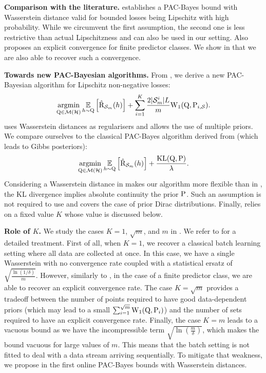 \textbf{Comparison with the literature.} \cite[][Theorem 11]{amit2022integral} establishes a PAC-Bayes bound with Wasserstein distance valid for bounded losses being Lipschitz with high probability. While we circumvent the first assumption, the second one is less restrictive than actual Lipschitzness and can also be used in our setting. Also \cite[Theorem 12]{amit2022integral} proposes an explicit convergence for finite predictor classes. We show in  that we are also able to recover such a convergence. 

\textbf{Towards new PAC-Bayesian algorithms.} From , we derive a new PAC-Bayesian algorithm for Lipschitz non-negative losses:
\begin{equation}
    \label{eq:batch-alg}
    \argmin_{\Q\in\Mcal(\H)} \EE_{h\sim \Q}\left[\Riskhat_{\Sm}(h)\right] + \sum_{i=1}^{K} \frac{2|\Sm^{i}|L}{m} \W_{1}(\Q, \P_{i,\S}).
\end{equation}
 uses Wasserstein distances as regularisers and allows the use of multiple priors. 
We compare ourselves to the classical PAC-Bayes algorithm derived from \cite[][Theorem 1.2.6]{catoni2007pac} (which leads to Gibbs posteriors):
\begin{equation}
    \label{eq:catoni-alg}
    \argmin_{\Q\in\Mcal(\H)} \EE_{h\sim \Q}\left[\Riskhat_{\Sm}(h)\right] +  \frac{\operatorname{KL}(\Q,\P)}{\lambda}.
\end{equation}
Considering a Wasserstein distance in  makes our algorithm more flexible than in , the KL divergence implies absolute continuity \wrt the prior $\P$.
Such an assumption is not required to use  and covers the case of prior Dirac distributions.
Finally,  relies on a fixed value $K$ whose value is discussed below.

\textbf{Role of $K$.} 
We study the cases $K=1$, $\sqrt{m}$, and $m$ in . We refer to  for a detailed treatment.
First of all, when $K=1$, we recover a classical batch learning setting where all data are collected at once.
In this case, we have a single Wasserstein with no convergence rate coupled with a statistical ersatz of $\sqrt{\frac{\ln(1/\delta)}{m}}$.
However, similarly to \cite[][Theorem 12]{amit2022integral}, in the case of a finite predictor class, we are able to recover an explicit convergence rate.
The case $K=\sqrt{m}$ provides a tradeoff between the number of points required to have good data-dependent priors (which may lead to a small $\sum_{i=1}^{\sqrt{m}}\W_{1}(\Q, \P_i)$) and the number of sets required to have an explicit convergence rate. 
Finally, the case $K=m$ leads to a vacuous bound as we have the incompressible term $\sqrt{\ln\left(\frac{m}{\delta}\right)}$, which makes the bound vacuous for large values of $m$.
This means that the batch setting is not fitted to deal with a data stream arriving sequentially. To mitigate that weakness, we propose in  the first online PAC-Bayes bounds with Wasserstein distances.

